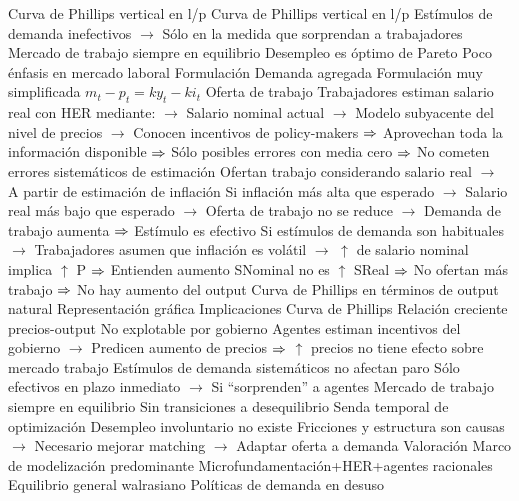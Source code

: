 \documentclass{nuevotema}
\begin{document}
\begin{esquemal}
				\4[$\then$] Curva de Phillips vertical en l/p
				\4[] Curva de Phillips vertical en l/p
				\4[] Estímulos de demanda inefectivos
				\4[] $\to$ Sólo en la medida que sorprendan a trabajadores
				\4[] Mercado de trabajo siempre en equilibrio
				\4[] Desempleo es óptimo de Pareto
				\4[] Poco énfasis en mercado laboral
			\3 Formulación
				\4 Demanda agregada
				\4[] Formulación muy simplificada
				\4[] $m_t - p_t = ky_t - k i_t$
				\4 Oferta de trabajo
				\4[] Trabajadores estiman salario real con HER mediante:
				\4[] $\to$ Salario nominal actual
				\4[] $\to$ Modelo subyacente del nivel de precios
				\4[] $\to$ Conocen incentivos de policy-makers
				\4[] $\then$ Aprovechan toda la información disponible
				\4[] $\then$ Sólo posibles errores con media cero
				\4[] $\then$ No cometen errores sistemáticos de estimación
				\4[] Ofertan trabajo considerando salario real
				\4[] $\to$ A partir de estimación de inflación
				\4[] Si inflación más alta que esperado
				\4[] $\to$ Salario real más bajo que esperado
				\4[] $\to$ Oferta de trabajo no se reduce
				\4[] $\to$ Demanda de trabajo aumenta
				\4[] $\then$ Estímulo es efectivo
				\4[] Si estímulos de demanda son habituales
				\4[] $\to$ Trabajadores asumen que inflación es volátil
				\4[] $\to$ $\uparrow$ de salario nominal implica $\uparrow$ P
				\4[] $\then$ Entienden aumento SNominal no es $\uparrow$ SReal
				\4[] $\then$ No ofertan más trabajo
				\4[] $\then$ No hay aumento del output
				\4 Curva de Phillips en términos de output natural
				\4[] 
				\4 Representación gráfica
				\4[] 
			\3 Implicaciones
				\4 Curva de Phillips
				\4[] Relación creciente precios-output
				\4[] No explotable por gobierno
				\4[] Agentes estiman incentivos del gobierno
				\4[] $\to$ Predicen aumento de precios
				\4[] $\then$ $\uparrow$ precios no tiene efecto sobre mercado trabajo
				\4 Estímulos de demanda sistemáticos no afectan paro
				\4[] Sólo efectivos en plazo inmediato
				\4[] $\to$ Si ``sorprenden'' a agentes
				\4 Mercado de trabajo siempre en equilibrio
				\4[] Sin transiciones a desequilibrio
				\4[] Senda temporal de optimización
				\4 Desempleo involuntario no existe
				\4[] Fricciones y estructura son causas
				\4[] $\to$ Necesario mejorar matching
				\4[] $\to$ Adaptar oferta a demanda
			\3 Valoración
				\4 Marco de modelización predominante
				\4[] Microfundamentación+HER+agentes racionales
				\4[] Equilibrio general walrasiano
				\4 Políticas de demanda en desuso

\end{esquemal}
\end{document}
